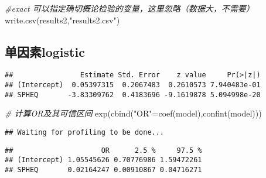 \documentclass[]{ctexbook}
\newenvironment{Shaded}{\begin{snugshade}}{\end{snugshade}}
\newcommand{\AttributeTok}[1]{\textcolor[rgb]{0.77,0.63,0.00}{#1}}
\newcommand{\CommentTok}[1]{\textcolor[rgb]{0.56,0.35,0.01}{\textit{#1}}}
\newcommand{\FunctionTok}[1]{\textcolor[rgb]{0.00,0.00,0.00}{#1}}
\newcommand{\NormalTok}[1]{#1}
\newcommand{\OtherTok}[1]{\textcolor[rgb]{0.56,0.35,0.01}{#1}}
\newcommand{\SpecialCharTok}[1]{\textcolor[rgb]{0.00,0.00,0.00}{#1}}
\newcommand{\StringTok}[1]{\textcolor[rgb]{0.31,0.60,0.02}{#1}}
\begin{document}
\begin{Shaded}
\begin{Highlighting}[]
\CommentTok{\#exact 可以指定确切概论检验的变量，这里忽略（数据大，不需要）}
\FunctionTok{write.csv}\NormalTok{(results2,}\StringTok{"results2.csv"}\NormalTok{)}
\end{Highlighting}
\end{Shaded}

\hypertarget{ux5355ux56e0ux7d20logistic}{%
\subsection{单因素logistic}\label{ux5355ux56e0ux7d20logistic}}

\begin{Shaded}
\end{Shaded}

\begin{verbatim}
##                Estimate Std. Error    z value     Pr(>|z|)
## (Intercept)  0.05397315  0.2067483  0.2610573 7.940483e-01
## SPHEQ       -3.83309762  0.4183696 -9.1619878 5.094998e-20
\end{verbatim}

\begin{Shaded}
\begin{Highlighting}[]
\CommentTok{\# 计算OR及其可信区间}
\FunctionTok{exp}\NormalTok{(}\FunctionTok{cbind}\NormalTok{(}\StringTok{"OR"}\OtherTok{=}\FunctionTok{coef}\NormalTok{(model),}\FunctionTok{confint}\NormalTok{(model)))}
\end{Highlighting}
\end{Shaded}

\begin{verbatim}
## Waiting for profiling to be done...
\end{verbatim}

\begin{verbatim}
##                     OR      2.5 %     97.5 %
## (Intercept) 1.05545626 0.70776986 1.59472261
## SPHEQ       0.02164247 0.00910867 0.04716271
\end{verbatim}
\end{document}
